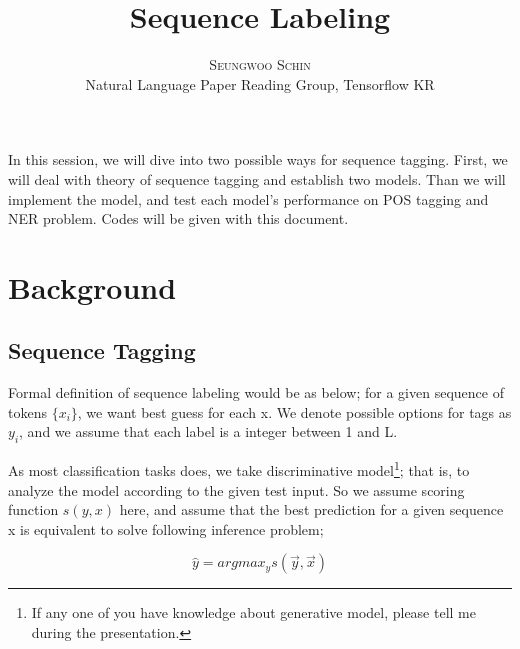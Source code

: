 \documentclass[twoside]{article}
\title{\vspace{-15mm}\fontsize{24pt}{10pt}\selectfont\textbf{ Sequence Labeling }} %
\author{
\large
\textsc{Seungwoo Schin}\\[2mm]
\normalsize Natural Language Paper Reading Group, Tensorflow KR \\ %
\vspace{-5mm}
}
\date{}
\begin{document}
\maketitle %

\thispagestyle{fancy} %





In this session, we will dive into two possible ways for sequence tagging. First, we will deal with theory of sequence tagging and establish two models. Than we will implement the model, and test each model's performance on POS tagging and NER problem. Codes will be given with this document. 


\section{Background} 

\subsection{Sequence Tagging} 

Formal definition of sequence labeling would be as below; for a given sequence of tokens $\{x_i\}$, we want best guess for each x. We denote possible options for tags as $y_i$, and we assume that each label is a integer between 1 and L. 

As most classification tasks does, we take discriminative model\footnote{If any one of you have knowledge about generative model, please tell me during the presentation.}; that is, to analyze the model according to the given test input. So we assume scoring function $s(y,x)$ here, and assume that the best prediction for a given sequence x is equivalent to solve following inference problem; 

\begin{equation} 
\hat{y} = argmax_{y} s(\vec{y}, \vec{x})
\end{equation}
\end{document}
